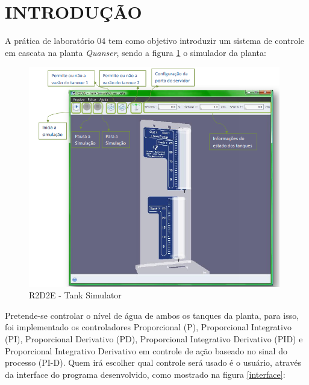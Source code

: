 \documentclass[a4paper,12pt]{article}
\begin{document}
\newpage


\thispagestyle{main}

\section{INTRODUÇÃO}

\begin{flushleft}
\hspace{4ex}A prática de laboratório 04 tem como objetivo introduzir um sistema de controle em cascata na planta \textit{Quanser}, sendo a figura \ref{r2d2e} o simulador da planta:

\begin{figure}[H]
\centering
\includegraphics[width=11cm]{ImagensLab4/simulator.png}
\caption{R2D2E - Tank Simulator}
\label{r2d2e}
\end{figure}

\hspace{4ex}Pretende-se controlar o nível de água de ambos os tanques da planta, para isso, foi implementado os controladores Proporcional (P), Proporcional Integrativo (PI), Proporcional Derivativo (PD), Proporcional Integrativo Derivativo (PID) e Proporcional Integrativo Derivativo em controle de ação baseado no sinal do processo (PI-D). Quem irá escolher qual controle será usado é o usuário, através da interface do programa desenvolvido, como mostrado na figura \ref{interface}:


\end{flushleft}
\end{document}
